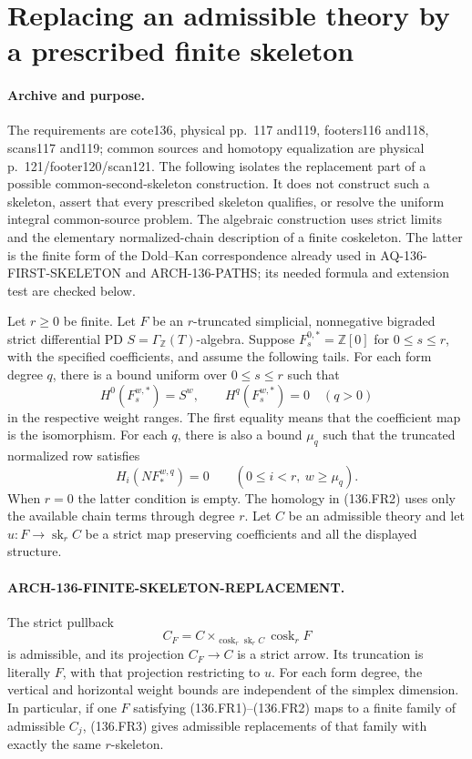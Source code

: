 \section{Replacing an admissible theory by a prescribed finite skeleton}
\label{sec:136-finite-skeleton-replacement}

\paragraph{Archive and purpose.}
The requirements are cote136, physical pp.~117 and119,
footers116 and118, scans117 and119; common sources and
homotopy equalization are physical p.~121/footer120/scan121.
The following isolates the replacement part of a possible
common-second-skeleton construction. It does not construct
such a skeleton, assert that every prescribed skeleton qualifies,
or resolve the uniform integral common-source problem.
The algebraic construction uses strict limits and the elementary
normalized-chain description of a finite coskeleton. The latter
is the finite form of the Dold--Kan correspondence already used
in AQ-136-FIRST-SKELETON and ARCH-136-PATHS; its needed formula
and extension test are checked below.

Let \(r\geq0\) be finite. Let \(F\) be an \(r\)-truncated
simplicial, nonnegative bigraded strict differential PD
\(S=\Gamma_{\mathbb Z}(T)\)-algebra. Suppose
\(F_s^{0,*}=\mathbb Z[0]\) for \(0\leq s\leq r\),
with the specified coefficients, and assume the following tails.
For each form degree \(q\), there is a bound uniform over
\(0\leq s\leq r\) such that
\[
 H^0(F_s^{w,*})=S^w,\qquad
 H^q(F_s^{w,*})=0\quad(q>0)
                                                        \tag{136.FR1}
\]
in the respective weight ranges. The first equality means that
the coefficient map is the isomorphism. For each \(q\),
there is also a bound \(\mu_q\) such that the truncated
normalized row satisfies
\[
 H_i(NF_*^{w,q})=0\qquad(0\leq i<r,\ w\geq\mu_q).
                                                        \tag{136.FR2}
\]
When \(r=0\) the latter condition is empty. The homology
in (136.FR2) uses only the available chain terms through degree
\(r\). Let \(C\) be an admissible theory and let
\(u:F\to\operatorname{sk}_r C\) be a strict map preserving
coefficients and all the displayed structure.

\paragraph{ARCH-136-FINITE-SKELETON-REPLACEMENT.}
The strict pullback
\[
 C_F=C\mathbin{\times}_{\operatorname{cosk}_r\operatorname{sk}_r C}
                         \operatorname{cosk}_r F          \tag{136.FR3}
\]
is admissible, and its projection \(C_F\to C\) is a
strict arrow. Its truncation is literally \(F\), with that
projection restricting to \(u\). For each form degree, the
vertical and horizontal weight bounds are independent of the
simplex dimension. In particular, if one \(F\) satisfying
(136.FR1)--(136.FR2) maps to a finite family of admissible
\(C_j\), (136.FR3) gives admissible replacements of that
family with exactly the same \(r\)-skeleton.

